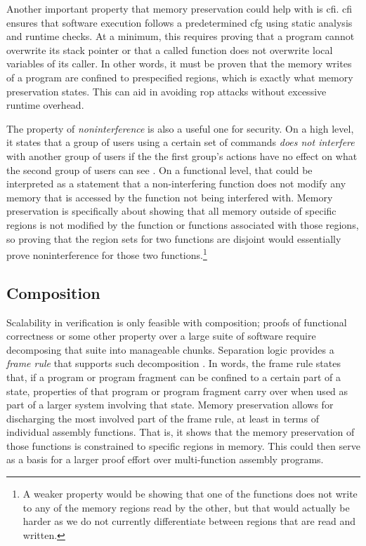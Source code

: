 Another important property that memory preservation could help with
is \ac{cfi}. \Ac{cfi} ensures that software execution
follows a predetermined \ac{cfg} using static analysis and runtime checks.
At a minimum, this requires proving that a program cannot overwrite its stack pointer
or that a called function does not overwrite local variables of its caller.
In other words, it must be proven that the memory writes of a program
are confined to prespecified regions, which is exactly what memory preservation states.
This can aid in avoiding \ac{rop} attacks without excessive runtime overhead.

The property of \emph{noninterference} is also a useful one for security.
On a high level, it states that a group of users using a certain set of commands
\emph{does not interfere} with another group of users if the the first group's actions
have no effect on what the second group of users can see
\autocite{goguen1982security,rushby1992noninterference}.
On a functional level, that could be interpreted as a statement that a non-interfering function does not modify any memory that is accessed
by the function not being interfered with.
Memory preservation is specifically about showing that all memory outside of
specific regions is not modified by the function
or functions associated with those regions, so proving that the region sets
for two functions are disjoint
would essentially prove noninterference for those two functions.\footnote{%
  A weaker property would be showing that one of the functions does not write
  to any of the memory regions read by the other, but that would actually be harder
  as we do not currently differentiate between regions that are read and written.%
}

\subsection{Composition}\label{sse:composition}
Scalability in verification is only feasible with composition;
proofs of functional correctness or some other property over a large suite of software
require decomposing that suite into manageable chunks.
Separation logic provides a \emph{frame rule} that supports such%
decomposition \autocite{o2001local,reynolds2002separation,krebbers2017essence}.
In words, the frame rule states that,
if a program or program fragment can be confined to a certain part of a state,
properties of that program or program fragment carry over
when used as part of a larger system involving that state.
Memory preservation allows for discharging the most involved part of the frame rule,
at least in terms of individual assembly functions.
That is, it shows that the memory preservation of those functions is constrained
to specific regions in memory.
This could then serve as a basis
for a larger proof effort over multi-function assembly programs.

